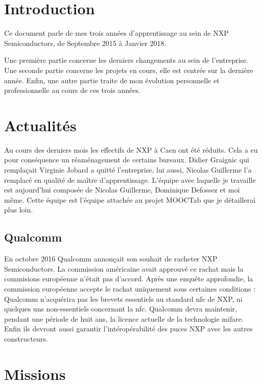 \documentclass[french,12pt,a4paper,titlepage,openright,openbib]{report}
\begin{document}
\chapter{Introduction}

Ce document parle de mes trois années d'apprentissage au sein de NXP Semiconductors, de Septembre 2015 à Janvier 2018.

Une première partie concerne les derniers changements au sein de l'entreprise.
Une seconde partie concerne les projets en cours, elle est centrée sur la dernière année.
Enfin, une autre partie traite de mon évolution personnelle et professionnelle au cours de ces trois années.

\chapter{Actualités}

Au cours des derniers mois les effectifs de NXP à Caen ont été réduits. Cela a eu pour conséquence un réaménagement de certains bureaux.
Didier Graignic qui remplaçait Virginie Jobard a quitté l'entreprise, lui aussi, Nicolas Guillerme l'a remplacé en qualité de maître d'apprentissage.
L'équipe avec laquelle je travaille est aujourd'hui composée de Nicolas Guillerme, Dominique Defossez et moi même. Cette équipe est l'équipe attachée au projet MOOCTab que je détaillerai plus loin.


\section{Qualcomm}

En octobre 2016 Qualcomm annonçait son souhait de racheter NXP Semiconductors. La commission américaine avait approuvé ce rachat mais la commisions européenne n'était pas d'accord. Après une enquête approfondie, la commission européenne accepte le rachat uniquement sous certaines conditions :
Qualcomm n'acquérira pas les brevets essentiels au standard \gls{nfc} de NXP, ni quelques uns non-essentiels concernant la \gls{nfc}.
Qualcomm devra maintenir, pendant une période de huit ans, la licence actuelle de la technologie \gls{mifare}. Enfin ils devront aussi garantir l'intéropérabilité des puces NXP avec les autres constructeurs.

\chapter{Missions}

\lipsum[1-1]
\end{document}
